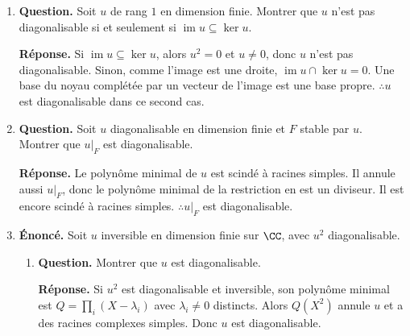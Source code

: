 \documentclass[12pt, a4paper]{article}
\begin{document}
\begin{enumerate}[label=9.\arabic*., start=94]
\begin{minipage}[t]{\linewidth}
\begin{enumerate}[\arabic*.]
  \item \textbf{Question.} Il existe un multiple $P$ de $X^2-X$ tel que $P(f)=0$.
\par\smallskip
\textbf{Réponse.} Tel qu'écrit, aucune restriction : le polynôme nul convient toujours.
        Si $P$ doit être non nul et $E$ est de dimension finie, tout $f$ convient encore avec $P=(X^2-X)\chi_f$.
        En dimension infinie, cela impose seulement l'existence d'un polynôme annulateur non nul.

\end{enumerate}
\end{minipage}

  \item \begin{minipage}[t]{\linewidth}\raggedright
\textbf{Question.} Soit $u$ de rang $1$ en dimension finie. Montrer que $u$ n’est pas diagonalisable si et seulement si $\operatorname{im}u\subseteq\ker u$.
\par\smallskip
\textbf{Réponse.} Si $\operatorname{im}u\subseteq\ker u$, alors $u^2=0$ et $u\neq0$, donc $u$ n'est pas diagonalisable.
    Sinon, comme l'image est une droite, $\operatorname{im}u\cap\ker u=0$.
    Une base du noyau complétée par un vecteur de l'image est une base propre.
    $\therefore u$ est diagonalisable dans ce second cas.
\end{minipage}

  \item \begin{minipage}[t]{\linewidth}\raggedright
\textbf{Question.} Soit $u$ diagonalisable en dimension finie et $F$ stable par $u$. Montrer que $u|_F$ est diagonalisable.
\par\smallskip
\textbf{Réponse.} Le polynôme minimal de $u$ est scindé à racines simples.
    Il annule aussi $u|_F$, donc le polynôme minimal de la restriction en est un diviseur.
    Il est encore scindé à racines simples.
    $\therefore u|_F$ est diagonalisable.
\end{minipage}

  \item \begin{minipage}[t]{\linewidth}\raggedright
\textbf{Énoncé.} Soit $u$ inversible en dimension finie sur $\CC$, avec $u^2$ diagonalisable.

\begin{enumerate}[\arabic*.]
        \item \textbf{Question.} Montrer que $u$ est diagonalisable.
\par\smallskip
\textbf{Réponse.} Si $u^2$ est diagonalisable et inversible, son polynôme minimal est $Q=\prod_i(X-\lambda_i)$ avec $\lambda_i\neq0$ distincts.
        Alors $Q(X^2)$ annule $u$ et a des racines complexes simples.
        Donc $u$ est diagonalisable.


\end{enumerate}
\end{minipage}
\end{enumerate}
\end{document}

